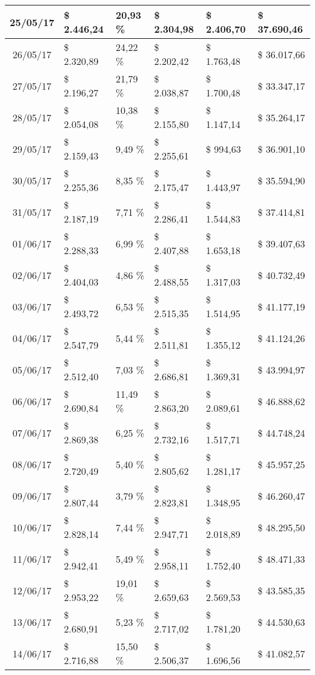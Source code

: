 \begin{small}
\begin{longtable}{|c|l|l|l|l|l|}
25/05/17 & \$ 2.446,24 & 20,93 \% & \$ 2.304,98 & \$ 2.406,70 & \$ 37.690,46 \\ \hline
26/05/17 & \$ 2.320,89 & 24,22 \% & \$ 2.202,42 & \$ 1.763,48 & \$ 36.017,66 \\ \hline
27/05/17 & \$ 2.196,27 & 21,79 \% & \$ 2.038,87 & \$ 1.700,48 & \$ 33.347,17 \\ \hline
28/05/17 & \$ 2.054,08 & 10,38 \% & \$ 2.155,80 & \$ 1.147,14 & \$ 35.264,17 \\ \hline
29/05/17 & \$ 2.159,43 & 9,49 \% & \$ 2.255,61 & \$ 994,63 & \$ 36.901,10 \\ \hline
30/05/17 & \$ 2.255,36 & 8,35 \% & \$ 2.175,47 & \$ 1.443,97 & \$ 35.594,90 \\ \hline
31/05/17 & \$ 2.187,19 & 7,71 \% & \$ 2.286,41 & \$ 1.544,83 & \$ 37.414,81 \\ \hline
01/06/17 & \$ 2.288,33 & 6,99 \% & \$ 2.407,88 & \$ 1.653,18 & \$ 39.407,63 \\ \hline
02/06/17 & \$ 2.404,03 & 4,86 \% & \$ 2.488,55 & \$ 1.317,03 & \$ 40.732,49 \\ \hline
03/06/17 & \$ 2.493,72 & 6,53 \% & \$ 2.515,35 & \$ 1.514,95 & \$ 41.177,19 \\ \hline
04/06/17 & \$ 2.547,79 & 5,44 \% & \$ 2.511,81 & \$ 1.355,12 & \$ 41.124,26 \\ \hline
05/06/17 & \$ 2.512,40 & 7,03 \% & \$ 2.686,81 & \$ 1.369,31 & \$ 43.994,97 \\ \hline
06/06/17 & \$ 2.690,84 & 11,49 \% & \$ 2.863,20 & \$ 2.089,61 & \$ 46.888,62 \\ \hline
07/06/17 & \$ 2.869,38 & 6,25 \% & \$ 2.732,16 & \$ 1.517,71 & \$ 44.748,24 \\ \hline
08/06/17 & \$ 2.720,49 & 5,40 \% & \$ 2.805,62 & \$ 1.281,17 & \$ 45.957,25 \\ \hline
09/06/17 & \$ 2.807,44 & 3,79 \% & \$ 2.823,81 & \$ 1.348,95 & \$ 46.260,47 \\ \hline
10/06/17 & \$ 2.828,14 & 7,44 \% & \$ 2.947,71 & \$ 2.018,89 & \$ 48.295,50 \\ \hline
11/06/17 & \$ 2.942,41 & 5,49 \% & \$ 2.958,11 & \$ 1.752,40 & \$ 48.471,33 \\ \hline
12/06/17 & \$ 2.953,22 & 19,01 \% & \$ 2.659,63 & \$ 2.569,53 & \$ 43.585,35 \\ \hline
13/06/17 & \$ 2.680,91 & 5,23 \% & \$ 2.717,02 & \$ 1.781,20 & \$ 44.530,63 \\ \hline
14/06/17 & \$ 2.716,88 & 15,50 \% & \$ 2.506,37 & \$ 1.696,56 & \$ 41.082,57 \\ \hline

\end{longtable}
\end{small}
